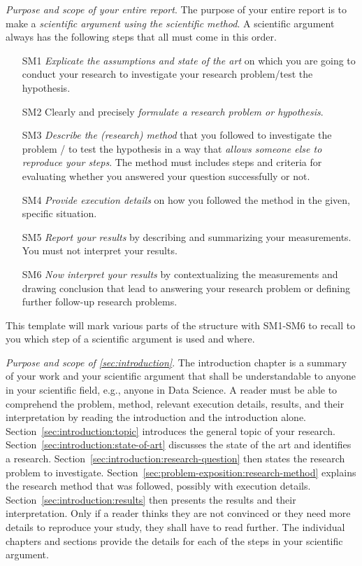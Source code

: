 \documentclass[
  fontsize=10pt,
  numbers=noenddot,
  english,  %
  paper=a5,
  twoside,  %
  DIV=calc,
  headings=small,
  bibliography=totoc,
  listof=totoc,
  draft=false
]{scrbook}
\theoremstyle{break}
\begin{document}
\emph{Purpose and scope of your entire report}.
The purpose of your entire report is to make a \emph{scientific argument using the scientific method}.
A scientific argument always has the following steps that all must come in this order.
%
\begin{itemize}
  \item[SM1] \emph{Explicate the assumptions and state of the art} on which you are going to conduct your research to investigate your research problem/test the hypothesis.
  \item[SM2] Clearly and precisely \emph{formulate a research problem or hypothesis}.
  \item[SM3] \emph{Describe the (research) method} that you followed to investigate the problem / to test the hypothesis in a way that \emph{allows someone else to reproduce your steps}.
        The method must includes steps and criteria for evaluating whether you answered your question successfully or not.
  \item[SM4] \emph{Provide execution details} on how you followed the method in the given, specific situation.
  \item[SM5] \emph{Report your results} by describing and summarizing your measurements.
        You must not interpret your results.
  \item[SM6] \emph{Now interpret your results} by contextualizing the measurements and drawing conclusion that lead to answering your research problem or defining further follow-up research problems.
\end{itemize}
%
This template will mark various parts of the structure with SM1-SM6 to recall to you which step of a scientific argument is used and where.

\emph{Purpose and scope of \cref{sec:introduction}}.
The introduction chapter is a summary of your work and your scientific argument that shall be understandable to anyone in your scientific field, e.g., anyone in Data Science.
A reader must be able to comprehend the problem, method, relevant execution details, results, and their interpretation by reading the introduction and the introduction alone.
Section~\ref{sec:introduction:topic} introduces the general topic of your research.
Section~\ref{sec:introduction:state-of-art} discusses the state of the art and identifies a research.
Section~\ref{sec:introduction:research-question} then states the research problem to investigate.
Section~\ref{sec:problem-exposition:research-method} explains the research method that was followed, possibly with execution details.
Section~\ref{sec:introduction:results} then presents the results and their interpretation.
Only if a reader thinks they are not convinced or they need more details to reproduce your study, they shall have to read further.
The individual chapters and sections provide the details for each of the steps in your scientific argument.
\end{document}
